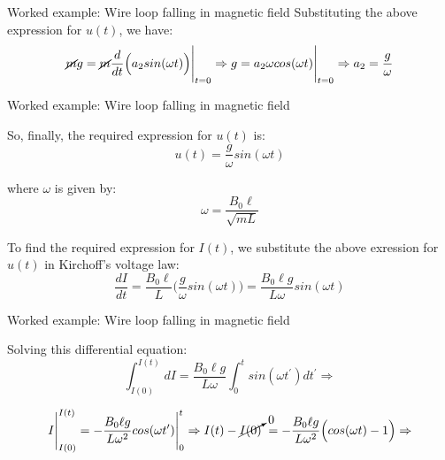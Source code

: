 {\begin{frame}{Worked example: Wire loop falling in magnetic field}
  Substituting the above expression for $u(t)$, we have:
  \begin{equation*}
    \cancel{m}g =
       \cancel{m} \frac{d}{dt}
         \Big( a_2 sin(\omega t) \Big)\Bigg\rvert_{t=0} \Rightarrow
    g = a_2 \omega cos(\omega t)\Bigg\rvert_{t=0} \Rightarrow
    a_2 = \frac{g}{\omega}
  \end{equation*}

\end{frame}

%
%
%

\begin{frame}{Worked example: Wire loop falling in magnetic field}

  So, finally, the required expression for $u(t)$ is:
  \begin{equation*}
    u(t) = \frac{g}{\omega} sin(\omega t)
  \end{equation*}

  where $\omega$ is given by:
  \begin{equation*}
    \omega = \frac{B_0 \ell}{\sqrt{mL}}
  \end{equation*}

  To find the required expression for $I(t)$, we substitute the above
  exression for $u(t)$ in Kirchoff's voltage law:
  \begin{equation*}
    \frac{dI}{dt} =
     \frac{B_0 \ell}{L}
      \Big( \frac{g}{\omega} sin(\omega t) \Big) =
      \frac{B_0 \ell g}{L \omega} sin(\omega t)
  \end{equation*}

\end{frame}

%
%
%

\begin{frame}{Worked example: Wire loop falling in magnetic field}

  Solving this differential equation:
  \begin{equation*}
    \int_{I(0)}^{I(t)} dI =
     \frac{B_0 \ell g}{L \omega}
       \int_{0}^{t} sin(\omega t^\prime) dt^\prime \Rightarrow
  \end{equation*}

  \begin{equation*}
     I \Bigg\rvert_{I(0)}^{I(t)} =
      - \frac{B_0 \ell g}{L \omega^2}
          cos(\omega t^\prime) \Bigg\rvert_{0}^{t} \Rightarrow
     I(t) - \cancelto{0}{I(0)} \; =
      - \frac{B_0 \ell g}{L \omega^2}
        \Big( cos(\omega t) - 1 \Big)  \Rightarrow
  \end{equation*}


\end{frame}}
